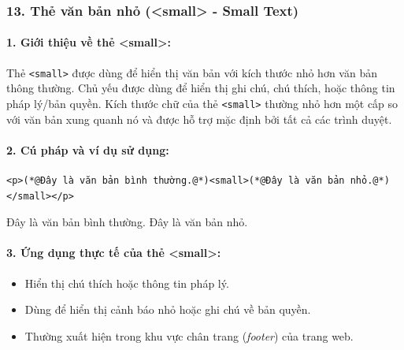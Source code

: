 \documentclass[11pt,oneside]{book}
\newcommand{\codeinline}[1]{\textcolor{accentOrange}{\texttt{#1}}}
\begin{document}
\subsubsection{13. Thẻ văn bản nhỏ (<small> - Small Text)}

\paragraph{1. Giới thiệu về thẻ <small>:}
Thẻ \codeinline{<small>} được dùng để hiển thị văn bản với kích thước nhỏ hơn văn bản thông thường. Chủ yếu được dùng để hiển thị ghi chú, chú thích, hoặc thông tin pháp lý/bản quyền. Kích thước chữ của thẻ \codeinline{<small>} thường nhỏ hơn một cấp so với văn bản xung quanh nó và được hỗ trợ mặc định bởi tất cả các trình duyệt.

\paragraph{2. Cú pháp và ví dụ sử dụng:}
\begin{codeWindow}
\begin{lstlisting}[language=HTML5]
<p>(*@Đây là văn bản bình thường.@*)<small>(*@Đây là văn bản nhỏ.@*)</small></p>
\end{lstlisting}
\end{codeWindow}

\begin{tcolorbox}[
    enhanced,
    colback=white,
    colframe=primaryBlue!20,
    arc=6pt,
    boxrule=0.8pt,
    drop shadow=black!3!white,
    top=8pt, bottom=8pt, left=12pt, right=12pt,
    title={\sffamily\bfseries\scriptsize\color{codeComment} KẾT QUẢ HIỂN THỊ TRÊN TRÌNH DUYỆT (BROWSER PREVIEW)},
    coltitle=codeComment,
    colbacktitle=codeBg!80!white
]
Đây là văn bản bình thường. {\small Đây là văn bản nhỏ.}
\end{tcolorbox}


\paragraph{3. Ứng dụng thực tế của thẻ <small>:}
\begin{itemize}[leftmargin=1.5em, itemsep=2pt, parsep=0pt]
    \item Hiển thị chú thích hoặc thông tin pháp lý.
    \item Dùng để hiển thị cảnh báo nhỏ hoặc ghi chú về bản quyền.
    \item Thường xuất hiện trong khu vực chân trang (\textit{footer}) của trang web.
\end{itemize}
\end{document}
